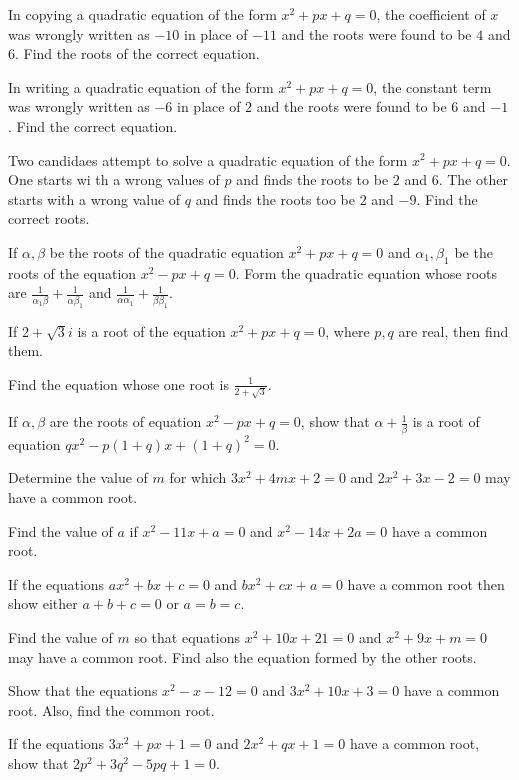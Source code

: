 \item In copying a quadratic equation of the form $x^2 + px + q = 0$, the coefficient of $x$ was wrongly written as $-10$ in place
  of $-11$ and the roots were found to be $4$ and $6$. Find the roots of the correct equation.
\item In writing a quadratic equation of the form $x^2 + px + q = 0$, the constant term was wrongly written as $-6$ in place of $2$
  and the roots were found to be $6$ and $-1$. Find the correct equation.
\item Two candidaes attempt to solve a quadratic equation of the form $x^2 + px + q = 0$. One starts wi th a wrong values of $p$
  and finds the roots to be $2$ and $6$. The other starts with a wrong value of $q$ and finds the roots too be $2$ and $-9$. Find
  the correct roots.
\item If $\alpha, \beta$ be the roots of the quadratic equation $x^2 + px + q = 0$ and $\alpha_1, \beta_1$ be the roots of the
  equation $x^2 - px + q = 0$. Form the quadratic equation whose roots are $\frac{1}{\alpha_1\beta} + \frac{1}{\alpha\beta_1}$ and
  $\frac{1}{\alpha\alpha_1} + \frac{1}{\beta\beta_1}$.
\item If $2 + \sqrt{3}i$ is a root of the equation $x^2 + px + q = 0$, where $p, q$ are real, then find them.
\item Find the equation whose one root is $\frac{1}{2 + \sqrt{3}}$.
\item If $\alpha, \beta$ are the roots of equation $x^2 - px + q = 0$, show that $\alpha + \frac{1}{\beta}$ is a root of equation
  $qx^2 - p(1 + q)x + (1 + q)^2 = 0$.
\item Determine the value of $m$ for which $3x^2 + 4mx + 2 = 0$ and $2x^2 + 3x - 2 = 0$ may have a common root.
\item Find the value of $a$ if $x^2 - 11x + a = 0$ and $x^2 - 14x + 2a = 0$ have a common root.
\item If the equations $ax^2 + bx + c = 0$ and $bx^2 + cx + a = 0$ have a common root then show either $a + b + c = 0$ or $a = b =
  c$.
\item Find the value of $m$ so that equations $x^2 + 10x + 21 = 0$ and $x^2 + 9x + m = 0$ may have a common root. Find also the
  equation formed by the other roots.
\item Show that the equations $x^2 - x - 12 = 0$ and $3x^2 + 10x + 3 = 0$ have a common root. Also, find the common root.
\item If the equations $3x^2 + px + 1 = 0$ and $2x^2 + qx + 1 = 0$ have a common root, show that $2p^2 + 3q^2 - 5pq + 1 = 0$.
